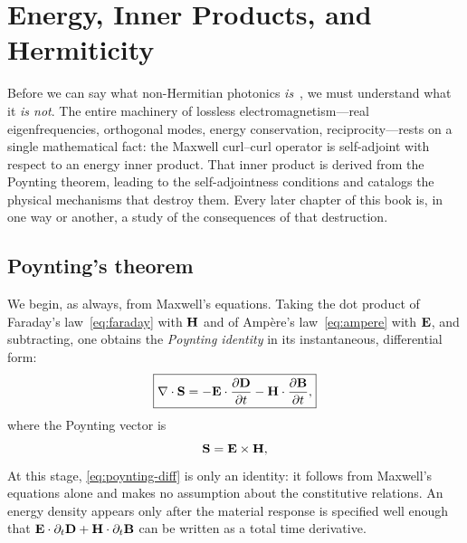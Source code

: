 \chapter{Energy, Inner Products, and Hermiticity}
\label{ch:energy-inner}

\begin{chapterlead}
Before we can say what non-Hermitian photonics \emph{is}~\cite{ozawa2018topological,bergholtz2019exceptional}, we must understand
what it \emph{is not}. The entire machinery of lossless electromagnetism---real
eigenfrequencies, orthogonal modes, energy conservation, reciprocity---rests
on a single mathematical fact: the Maxwell curl--curl operator is self-adjoint
with respect to an energy inner product. That inner product is derived
from the Poynting theorem, leading to the self-adjointness conditions
and catalogs the physical mechanisms that destroy them. Every later chapter
of this book is, in one way or another, a study of the consequences of that
destruction.
\end{chapterlead}


\section{Poynting's theorem}
\label{sec:poynting}

We begin, as always, from Maxwell's equations. Taking the dot product of
Faraday's law~\eqref{eq:faraday} with $\mathbf{H}$ and of Amp\`ere's
law~\eqref{eq:ampere} with $\mathbf{E}$, and subtracting, one obtains the
\emph{Poynting identity} in its instantaneous, differential form:
\begin{equation}
 \boxed{
 \nabla\cdot\mathbf{S}
 = -\mathbf{E}\cdot\frac{\partial \mathbf{D}}{\partial t} - \mathbf{H}\cdot\frac{\partial \mathbf{B}}{\partial t},
 }
 \label{eq:poynting-diff}
\end{equation}
where the Poynting vector is
\begin{equation}
 \mathbf{S} = \mathbf{E}\times\mathbf{H},
 \label{eq:poynting-vector}
\end{equation}
At this stage, \eqref{eq:poynting-diff} is only an identity: it follows
from Maxwell's equations alone and makes no assumption about the
constitutive relations. An energy density appears only after the material
response is specified well enough that
$\mathbf{E}\cdot\partial_t\mathbf{D}+\mathbf{H}\cdot\partial_t\mathbf{B}$ can be written as a total
time derivative.

